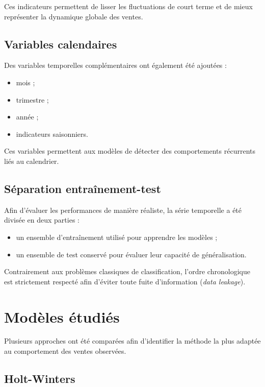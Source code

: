 \documentclass[12pt,a4paper,twoside]{report}
\begin{document}
Ces indicateurs permettent de lisser les fluctuations de court terme et de mieux représenter la dynamique globale des ventes.

\subsection{Variables calendaires}

Des variables temporelles complémentaires ont également été ajoutées :

\begin{itemize}
    \item mois ;
    \item trimestre ;
    \item année ;
    \item indicateurs saisonniers.
\end{itemize}

Ces variables permettent aux modèles de détecter des comportements récurrents liés au calendrier.

\subsection{Séparation entraînement-test}

Afin d'évaluer les performances de manière réaliste, la série temporelle a été divisée en deux parties :

\begin{itemize}
    \item un ensemble d'entraînement utilisé pour apprendre les modèles ;
    \item un ensemble de test conservé pour évaluer leur capacité de généralisation.
\end{itemize}

Contrairement aux problèmes classiques de classification, l'ordre chronologique est strictement respecté afin d'éviter toute fuite d'information (\textit{data leakage}).

\section{Modèles étudiés}

Plusieurs approches ont été comparées afin d'identifier la méthode la plus adaptée au comportement des ventes observées.

\subsection{Holt-Winters}
\end{document}
